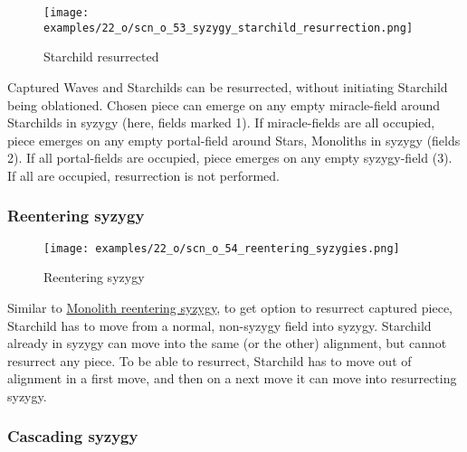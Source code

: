 \clearpage %

\vspace*{-2.1\baselineskip}
\noindent
\begin{figure}[!h]
\texttt{[image: examples/22\_o/scn\_o\_53\_syzygy\_starchild\_resurrection.png]}
\caption{Starchild resurrected}
\label{fig:scn_o_53_syzygy_starchild_resurrection}
\end{figure}

Captured Waves and Starchilds can be resurrected, without initiating Starchild
being oblationed. Chosen piece can emerge on any empty miracle-field around
Starchilds in syzygy (here, fields marked 1). If miracle-fields are all
occupied, piece emerges on any empty portal-field around Stars, Monoliths in
syzygy (fields 2). If all portal-fields are occupied, piece emerges on any
empty syzygy-field (3). If all are occupied, resurrection is not performed.

\clearpage %

\subsubsection*{Reentering syzygy}
\label{sec:One/Starchild/Syzygy/Reentering syzygy}

\vspace*{-1.2\baselineskip}
\noindent
\begin{figure}[!h]
\texttt{[image: examples/22\_o/scn\_o\_54\_reentering\_syzygies.png]}
\caption{Reentering syzygy}
\label{fig:scn_o_54_reentering_syzygies}
\end{figure}

Similar to
\hyperref[fig:scn_d_26_syzygy_reentering_same_move]{Monolith reentering syzygy},
to get option to resurrect captured piece, Starchild has to move from a normal,
non-syzygy field into syzygy. Starchild already in syzygy can move into the same
(or the other) alignment, but cannot resurrect any piece. To be able to resurrect,
Starchild has to move out of alignment in a first move, and then on a next move
it can move into resurrecting syzygy.

\clearpage %

\subsubsection*{Cascading syzygy}
\label{sec:One/Starchild/Syzygy/Cascading syzygy}

